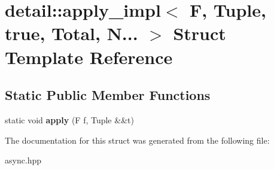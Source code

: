 \hypertarget{structdetail_1_1apply__impl_3_01_f_00_01_tuple_00_01true_00_01_total_00_01_n_8_8_8_01_4}{}\section{detail\+:\+:apply\+\_\+impl$<$ F, Tuple, true, Total, N... $>$ Struct Template Reference}
\label{structdetail_1_1apply__impl_3_01_f_00_01_tuple_00_01true_00_01_total_00_01_n_8_8_8_01_4}
\subsection*{Static Public Member Functions}
\begin{DoxyCompactItemize}
\item 
\mbox{\label{structdetail_1_1apply__impl_3_01_f_00_01_tuple_00_01true_00_01_total_00_01_n_8_8_8_01_4_a66cf9d7c78c88f55ee6f435a4fa600da}} 
static void {\bfseries apply} (F f, Tuple \&\&t)
\end{DoxyCompactItemize}


The documentation for this struct was generated from the following file\+:\begin{DoxyCompactItemize}
\item 
async.\+hpp\end{DoxyCompactItemize}
